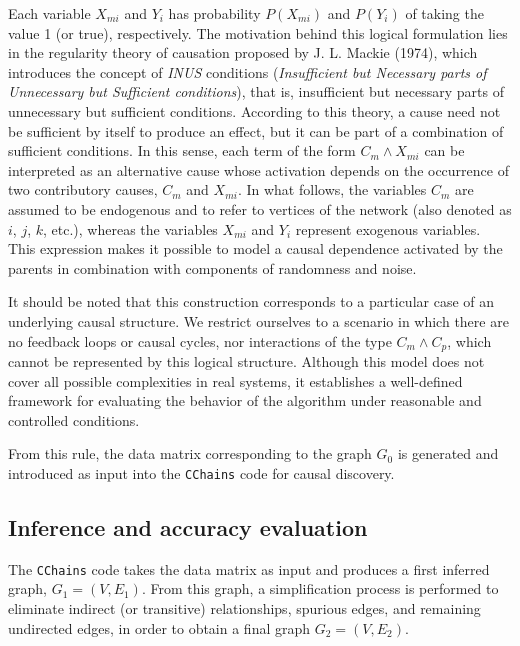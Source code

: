 \documentclass[12pt,a4paper]{report}
\begin{document}
Each variable $X_{mi}$ and $Y_{i}$ has probability \( P(X_{mi}) \) and \( P(Y_{i}) \) of taking the value 1 (or true), respectively. The motivation behind this logical formulation lies in the regularity theory of causation proposed by J. L. Mackie (1974), which introduces the concept of \textit{INUS} conditions (\textit{Insufficient but Necessary parts of Unnecessary but Sufficient conditions}), that is, insufficient but necessary parts of unnecessary but sufficient conditions\cite{makkie}. According to this theory, a cause need not be sufficient by itself to produce an effect, but it can be part of a combination of sufficient conditions. In this sense, each term of the form \( C_m \land X_{mi} \) can be interpreted as an alternative cause whose activation depends on the occurrence of two contributory causes, $C_m$ and $X_{mi}$. In what follows, the variables $C_m$ are assumed to be endogenous and to refer to vertices of the network (also denoted as $i$, $j$, $k$, etc.), whereas the variables $X_{mi}$ and $Y_{i}$ represent exogenous variables. This expression makes it possible to model a causal dependence activated by the parents in combination with components of randomness and noise. 

It should be noted that this construction corresponds to a particular case of an underlying causal structure. We restrict ourselves to a scenario in which there are no feedback loops or causal cycles, nor interactions of the type $C_{m} \land C_{p}$, which cannot be represented by this logical structure. Although this model does not cover all possible complexities in real systems, it establishes a well-defined framework for evaluating the behavior of the algorithm under reasonable and controlled conditions.


From this rule, the data matrix corresponding to the graph \( G_0 \) is generated and introduced as input into the \texttt{CChains} code for causal discovery.

\subsection*{Inference and accuracy evaluation}

The \texttt{CChains} code takes the data matrix as input and produces a first inferred graph, \( G_1 = (V, E_1) \). From this graph, a simplification process is performed to eliminate indirect (or transitive) relationships, spurious edges, and remaining undirected edges, in order to obtain a final graph \( G_2 = (V, E_2) \).
\end{document}
